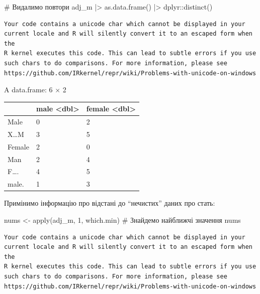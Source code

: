 \documentclass[
  letterpaper,
  DIV=11,
  numbers=noendperiod]{scrreprt}
\newenvironment{Shaded}{\begin{snugshade}}{\end{snugshade}}
\newcommand{\CommentTok}[1]{\textcolor[rgb]{0.37,0.37,0.37}{#1}}
\newcommand{\DecValTok}[1]{\textcolor[rgb]{0.68,0.00,0.00}{#1}}
\newcommand{\FunctionTok}[1]{\textcolor[rgb]{0.28,0.35,0.67}{#1}}
\newcommand{\NormalTok}[1]{\textcolor[rgb]{0.00,0.23,0.31}{#1}}
\newcommand{\OtherTok}[1]{\textcolor[rgb]{0.00,0.23,0.31}{#1}}
\newcommand{\SpecialCharTok}[1]{\textcolor[rgb]{0.37,0.37,0.37}{#1}}
\begin{document}
\begin{Shaded}
\begin{Highlighting}[]
\CommentTok{\# Видалимо повтори}
\NormalTok{adj\_m }\SpecialCharTok{|\textgreater{}} \FunctionTok{as.data.frame}\NormalTok{() }\SpecialCharTok{|\textgreater{}}\NormalTok{ dplyr}\SpecialCharTok{::}\FunctionTok{distinct}\NormalTok{()}
\end{Highlighting}
\end{Shaded}

\begin{verbatim}
Your code contains a unicode char which cannot be displayed in your
current locale and R will silently convert it to an escaped form when the
R kernel executes this code. This can lead to subtle errors if you use
such chars to do comparisons. For more information, please see
https://github.com/IRkernel/repr/wiki/Problems-with-unicode-on-windows
\end{verbatim}

A data.frame: 6 × 2

\begin{longtable}[]{@{}lll@{}}
\toprule\noalign{}
& male \textless dbl\textgreater{} & female
\textless dbl\textgreater{} \\
\midrule\noalign{}
\endhead
\bottomrule\noalign{}
\endlastfoot
Male & 0 & 2 \\
X\ldots M & 3 & 5 \\
Female & 2 & 0 \\
Man & 2 & 4 \\
F\ldots. & 4 & 5 \\
male. & 1 & 3 \\
\end{longtable}

Примінимо інформацію про відстані до ``нечистих'' даних про стать:

\begin{Shaded}
\begin{Highlighting}[]
\NormalTok{nums }\OtherTok{\textless{}{-}} \FunctionTok{apply}\NormalTok{(adj\_m, }\DecValTok{1}\NormalTok{, which.min) }\CommentTok{\# Знайдемо найближчі значення}
\NormalTok{nums}
\end{Highlighting}
\end{Shaded}

\begin{verbatim}
Your code contains a unicode char which cannot be displayed in your
current locale and R will silently convert it to an escaped form when the
R kernel executes this code. This can lead to subtle errors if you use
such chars to do comparisons. For more information, please see
https://github.com/IRkernel/repr/wiki/Problems-with-unicode-on-windows
\end{verbatim}
\end{document}
